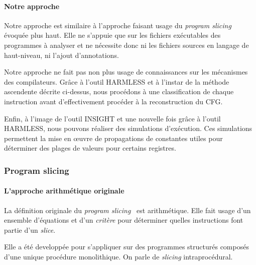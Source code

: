       \paragraph{Notre approche}
      { Notre approche est similaire à l'approche faisant usage du
          \textit{program slicing} évoquée plus haut. Elle ne s'appuie que sur
          les fichiers exécutables des programmes à analyser et ne nécessite
          donc ni les fichiers sources en langage de haut-niveau, ni l'ajout
          d'annotations.

        Notre approche ne fait pas non plus usage de connaissances sur les
        mécanismes des compilateurs. Grâce à l'outil \textsc{HARMLESS}
        \cite{KBB12} et à l'instar de la méthode ascendente décrite ci-dessus,
        nous procédons à une classification de chaque instruction avant
        d'effectivement procéder à la reconstruction du CFG.

        Enfin, à l'image de l'outil \textsc{INSIGHT} et une nouvelle fois grâce
        à l'outil \textsc{HARMLESS}, nous pouvons réaliser des simulations
        d'exécution. Ces simulations permettent la mise en {\oe}uvre de
        propagations de constantes utiles pour déterminer des plages de valeurs
        pour certains registres.


    \subsubsection{Program slicing}
      \paragraph{L'approche arithmétique originale}
      { La définition originale du \textit{program slicing}~\cite{Wei81} est
        arithmétique. Elle fait usage d'un ensemble d'équations et d'un
        \textit{critère} pour déterminer quelles instructions font partie d'un
        \textit{slice}.

        Elle a été developpée pour s'appliquer sur des programmes structurés
        composés d'une unique procédure monolithique. On parle de
        \textit{slicing} intraprocédural. }

}
